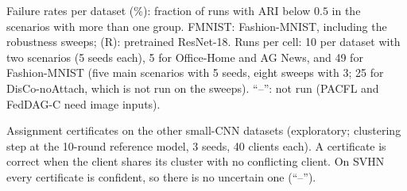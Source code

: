\begin{table}[!htbp]
\centering
\caption{Failure rates per dataset (\%): fraction of runs with ARI below $0.5$ in the scenarios with more than one group. FMNIST: Fashion-MNIST, including the robustness sweeps; (R): pretrained ResNet-18. Runs per cell: 10 per dataset with two scenarios (5 seeds each), 5 for Office-Home and AG News, and 49 for Fashion-MNIST (five main scenarios with 5 seeds, eight sweeps with 3; 25 for DisCo-noAttach, which is not run on the sweeps). ``--'': not run (PACFL and FedDAG-C need image inputs).}\label{tab:failure_ds}

\end{table}

\begin{table}[!htbp]
\centering
\caption{Assignment certificates on the other small-CNN datasets (exploratory; clustering step at the 10-round reference model, 3 seeds, 40 clients each). A certificate is correct when the client shares its cluster with no conflicting client. On SVHN every certificate is confident, so there is no uncertain one (``--'').}\label{tab:cert_ext}

\end{table}
